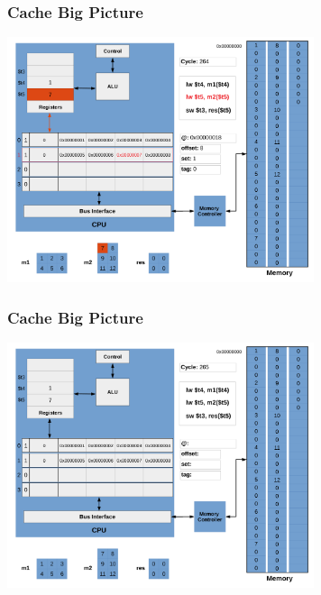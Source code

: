 \documentclass{beamer}
\begin{document}
\begin{frame}[fragile]
\frametitle{Cache Big Picture}

\begin{center}
\vspace*{-0.23cm}
\hspace*{-1cm}\includegraphics[width=9cm]{cache15.pdf}
\end{center}

\end{frame}

\begin{frame}[fragile]
\frametitle{Cache Big Picture}

\begin{center}
\vspace*{-0.23cm}
\hspace*{-1cm}\includegraphics[width=9cm]{cache16.pdf}
\end{center}

\end{frame}
\end{document}
